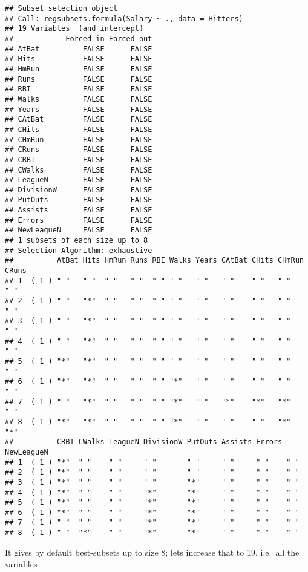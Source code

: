 \documentclass[]{article}
\newenvironment{Shaded}{\begin{snugshade}}{\end{snugshade}}
\newcommand{\KeywordTok}[1]{\textcolor[rgb]{0.13,0.29,0.53}{\textbf{#1}}}
\newcommand{\DataTypeTok}[1]{\textcolor[rgb]{0.13,0.29,0.53}{#1}}
\newcommand{\DecValTok}[1]{\textcolor[rgb]{0.00,0.00,0.81}{#1}}
\newcommand{\StringTok}[1]{\textcolor[rgb]{0.31,0.60,0.02}{#1}}
\newcommand{\OperatorTok}[1]{\textcolor[rgb]{0.81,0.36,0.00}{\textbf{#1}}}
\newcommand{\NormalTok}[1]{#1}
\begin{document}
\begin{verbatim}
## Subset selection object
## Call: regsubsets.formula(Salary ~ ., data = Hitters)
## 19 Variables  (and intercept)
##            Forced in Forced out
## AtBat          FALSE      FALSE
## Hits           FALSE      FALSE
## HmRun          FALSE      FALSE
## Runs           FALSE      FALSE
## RBI            FALSE      FALSE
## Walks          FALSE      FALSE
## Years          FALSE      FALSE
## CAtBat         FALSE      FALSE
## CHits          FALSE      FALSE
## CHmRun         FALSE      FALSE
## CRuns          FALSE      FALSE
## CRBI           FALSE      FALSE
## CWalks         FALSE      FALSE
## LeagueN        FALSE      FALSE
## DivisionW      FALSE      FALSE
## PutOuts        FALSE      FALSE
## Assists        FALSE      FALSE
## Errors         FALSE      FALSE
## NewLeagueN     FALSE      FALSE
## 1 subsets of each size up to 8
## Selection Algorithm: exhaustive
##          AtBat Hits HmRun Runs RBI Walks Years CAtBat CHits CHmRun CRuns
## 1  ( 1 ) " "   " "  " "   " "  " " " "   " "   " "    " "   " "    " "  
## 2  ( 1 ) " "   "*"  " "   " "  " " " "   " "   " "    " "   " "    " "  
## 3  ( 1 ) " "   "*"  " "   " "  " " " "   " "   " "    " "   " "    " "  
## 4  ( 1 ) " "   "*"  " "   " "  " " " "   " "   " "    " "   " "    " "  
## 5  ( 1 ) "*"   "*"  " "   " "  " " " "   " "   " "    " "   " "    " "  
## 6  ( 1 ) "*"   "*"  " "   " "  " " "*"   " "   " "    " "   " "    " "  
## 7  ( 1 ) " "   "*"  " "   " "  " " "*"   " "   "*"    "*"   "*"    " "  
## 8  ( 1 ) "*"   "*"  " "   " "  " " "*"   " "   " "    " "   "*"    "*"  
##          CRBI CWalks LeagueN DivisionW PutOuts Assists Errors NewLeagueN
## 1  ( 1 ) "*"  " "    " "     " "       " "     " "     " "    " "       
## 2  ( 1 ) "*"  " "    " "     " "       " "     " "     " "    " "       
## 3  ( 1 ) "*"  " "    " "     " "       "*"     " "     " "    " "       
## 4  ( 1 ) "*"  " "    " "     "*"       "*"     " "     " "    " "       
## 5  ( 1 ) "*"  " "    " "     "*"       "*"     " "     " "    " "       
## 6  ( 1 ) "*"  " "    " "     "*"       "*"     " "     " "    " "       
## 7  ( 1 ) " "  " "    " "     "*"       "*"     " "     " "    " "       
## 8  ( 1 ) " "  "*"    " "     "*"       "*"     " "     " "    " "
\end{verbatim}

It gives by default best-subsets up to size 8; lets increase that to 19,
i.e.~all the variables

\begin{Shaded}
\end{Shaded}
\end{document}
